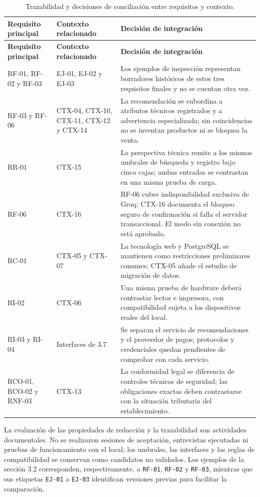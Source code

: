\documentclass[onecolumn,12pt,a4paper]{IEEEtran}
\begin{document}
\begin{longtable}{@{}p{3.0cm}p{4.0cm}p{8.0cm}@{}}
\caption{Trazabilidad y decisiones de conciliaci\'on entre requisitos y contexto.}\label{tab:trazabilidad_integrada}\\
\toprule
\textbf{Requisito principal} & \textbf{Contexto relacionado} & \textbf{Decisi\'on de integraci\'on}\\\midrule
\endfirsthead
\toprule
\textbf{Requisito principal} & \textbf{Contexto relacionado} & \textbf{Decisi\'on de integraci\'on}\\\midrule
\endhead
RF-01, RF-02 y RF-03 & EJ-01, EJ-02 y EJ-03 & Los ejemplos de inspecci\'on representan borradores hist\'oricos de estos tres requisitos finales y no se cuentan otra vez.\\
RF-03 y RF-06 & CTX-04, CTX-10, CTX-11, CTX-12 y CTX-14 & La recomendaci\'on se subordina a atributos t\'ecnicos registrados y a advertencia especializada; sin coincidencias no se inventan productos ni se bloquea la venta.\\
RR-01 & CTX-15 & La perspectiva t\'ecnica remite a los mismos umbrales de b\'usqueda y registro bajo cinco cajas; ambas entradas se contrastan en una misma prueba de carga.\\
RF-06 & CTX-16 & RF-06 cubre indisponibilidad exclusiva de Groq; CTX-16 documenta el bloqueo seguro de confirmaci\'on si falla el servidor transaccional. El modo sin conexi\'on no est\'a aprobado.\\
RC-01 & CTX-05 y CTX-07 & La tecnolog\'ia web y PostgreSQL se mantienen como restricciones preliminares comunes; CTX-05 a\~nade el estudio de migraci\'on de datos.\\
RI-02 & CTX-06 & Una misma prueba de hardware deber\'a contrastar lector e impresora, con compatibilidad sujeta a los dispositivos reales del local.\\
RI-03 y RI-04 & Interfaces de 3.7 & Se separan el servicio de recomendaciones y el proveedor de pagos; protocolos y credenciales quedan pendientes de comprobar con cada servicio.\\
RCO-01, RCO-02 y RNF-03 & CTX-13 & La conformidad legal se diferencia de controles t\'ecnicos de seguridad; las obligaciones exactas deben contrastarse con la situaci\'on tributaria del establecimiento.\\
\bottomrule
\end{longtable}

La evaluaci\'on de las propiedades de redacci\'on y la trazabilidad son actividades documentales. No se realizaron sesiones de aceptaci\'on, entrevistas ejecutadas ni pruebas de funcionamiento con el local; los umbrales, las interfaces y las reglas de compatibilidad se conservan como candidatos no validados. Los ejemplos de la secci\'on 3.2 corresponden, respectivamente, a \texttt{RF-01}, \texttt{RF-02} y \texttt{RF-03}, mientras que sus etiquetas \texttt{EJ-01} a \texttt{EJ-03} identifican versiones previas para facilitar la comparaci\'on.
\end{document}
